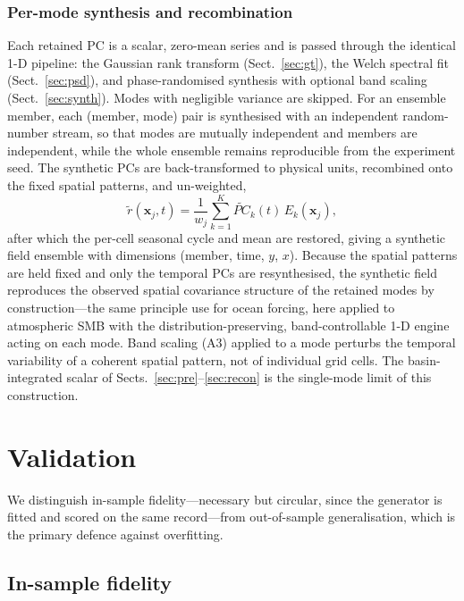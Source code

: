 \subsubsection{Per-mode synthesis and recombination}
Each retained PC is a scalar, zero-mean series and is passed through the
identical 1-D pipeline: the Gaussian rank transform (Sect.~\ref{sec:gt}), the
Welch spectral fit (Sect.~\ref{sec:psd}), and phase-randomised synthesis with
optional band scaling (Sect.~\ref{sec:synth}). Modes with negligible variance
are skipped. For an ensemble member, each (member, mode) pair is synthesised
with an independent random-number stream, so that modes are mutually
independent and members are independent, while the whole ensemble remains
reproducible from the experiment seed. The synthetic PCs are back-transformed
to physical units, recombined onto the fixed spatial patterns, and
un-weighted,
\begin{equation}\label{eq:recon2d}
  \tilde r(\mathbf{x}_j,t)
  = \frac{1}{w_j}\sum_{k=1}^{K}\widetilde{PC}_k(t)\,E_k(\mathbf{x}_j),
\end{equation}
after which the per-cell seasonal cycle and mean are restored,
giving a synthetic field ensemble with dimensions
(member, time, $y$, $x$). Because the spatial patterns are held fixed and only
the temporal PCs are resynthesised, the synthetic field reproduces the
observed spatial covariance structure of the retained modes by
construction---the same principle
\citet{muruganandham2023} use for ocean forcing, here applied to atmospheric
SMB with the distribution-preserving, band-controllable 1-D engine acting on
each mode. Band scaling (A3) applied to a mode perturbs the temporal
variability of a coherent spatial pattern, not of individual grid cells. The
basin-integrated scalar of Sects.~\ref{sec:pre}--\ref{sec:recon} is the
single-mode limit of this construction.


\section{Validation}\label{sec:validation}

We distinguish in-sample fidelity---necessary but circular, since the
generator is fitted and scored on the same record---from out-of-sample
generalisation, which is the primary defence against overfitting.

\subsection{In-sample fidelity}

